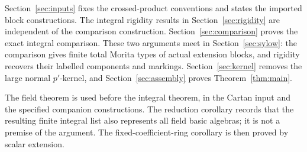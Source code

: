 Section~\ref{sec:inputs} fixes the crossed-product conventions and
states the imported block constructions.  The integral rigidity
results in Section~\ref{sec:rigidity} are independent of the comparison
construction.  Section~\ref{sec:comparison} proves the exact integral
comparison.  These two arguments meet in Section~\ref{sec:sylow}:
the comparison gives finite total Morita types of actual extension
blocks, and rigidity recovers their labelled components and markings.
Section~\ref{sec:kernel} removes the large normal $p'$-kernel, and
Section~\ref{sec:assembly} proves Theorem~\ref{thm:main}.

The field theorem is used before the integral theorem, in the Cartan
input and the specified companion constructions.  The reduction
corollary records that the resulting finite integral list also
represents all field basic algebras; it is not a premise of the argument.
The fixed-coefficient-ring corollary is then proved by scalar extension.

